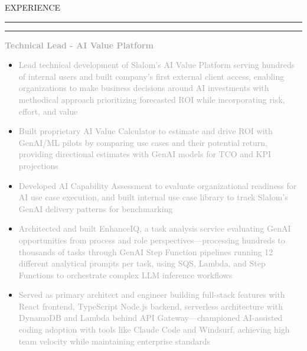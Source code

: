 \documentclass[10pt,letterpaper]{article}
\newcommand{\mainheader}[1]{%
    \vspace{6pt}
    {\displayfont\Large\textcolor{accent}{\MakeUppercase{#1}}}
    \vspace{1pt}
    \par\noindent\textcolor{accent}{\rule{4.7in}{2pt}}
    \vspace{3pt}
}
\newcommand{\companyHeader}[2]{%
    \vspace{3pt}
    \noindent\textcolor{#2}{\rule{3pt}{10pt}}\hspace{6pt}{\headingfont\normalsize\textbf{\textcolor{darkgray}{#1}}}
    \vspace{1pt}
}
\newcommand{\positionHeader}[2]{%
    \noindent\textbf{\textcolor{darkgray}{#2}}\hspace{4pt}{\footnotesize\textcolor{mediumgray}{//}}\hspace{4pt}{\footnotesize\itshape\textcolor{mediumgray}{#1}}
    \vspace{1pt}
}
\begin{document}
\begin{minipage}[t][10.5in][t]{5.3in}
\vspace{0.3in}
\hspace{0.3in}
\begin{minipage}{4.7in}
\raggedright

\mainheader{Experience}
\vspace{-8pt}

\companyHeader{Slalom}{company1}

\positionHeader{2023 – Present}{Technical Lead - AI Value Platform}
\begin{itemize}
    \setlength\itemsep{0.5pt}
    \item\small\textcolor{darkgray}{Lead technical development of Slalom's AI Value Platform serving hundreds of internal users and built company's first external client access, enabling organizations to make business decisions around AI investments with methodical approach prioritizing forecasted ROI while incorporating risk, effort, and value}
    \item\small\textcolor{darkgray}{Built proprietary AI Value Calculator to estimate and drive ROI with GenAI/ML pilots by comparing use cases and their potential return, providing directional estimates with GenAI models for TCO and KPI projections}
    \item\small\textcolor{darkgray}{Developed AI Capability Assessment to evaluate organizational readiness for AI use case execution, and built internal use case library to track Slalom's GenAI delivery patterns for benchmarking}
    \item\small\textcolor{darkgray}{Architected and built EnhanceIQ, a task analysis service evaluating GenAI opportunities from process and role perspectives—processing hundreds to thousands of tasks through GenAI Step Function pipelines running 12 different analytical prompts per task, using SQS, Lambda, and Step Functions to orchestrate complex LLM inference workflows}
    \item\small\textcolor{darkgray}{Served as primary architect and engineer building full-stack features with React frontend, TypeScript Node.js backend, serverless architecture with DynamoDB and Lambda behind API Gateway—championed AI-assisted coding adoption with tools like Claude Code and Windsurf, achieving high team velocity while maintaining enterprise standards}
\end{itemize}

\vspace{1pt}


\end{minipage}
\end{minipage}
\end{document}
